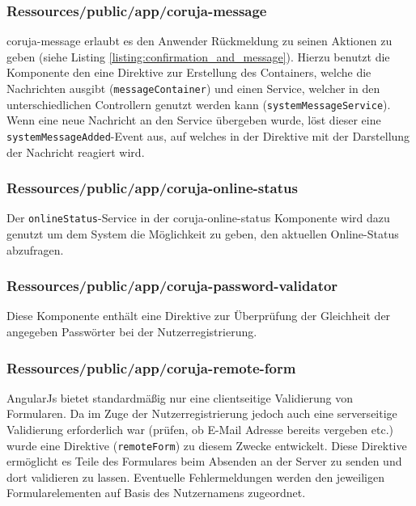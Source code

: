 \subsubsection*{Ressources/public/app/coruja-message}
coruja-message erlaubt es den Anwender Rückmeldung zu seinen Aktionen zu geben (siehe Listing \ref{listing:confirmation_and_message}). Hierzu benutzt die Komponente den eine Direktive zur Erstellung des Containers, welche die Nachrichten ausgibt (\texttt{messageContainer}) und einen Service, welcher in den unterschiedlichen Controllern genutzt werden kann (\texttt{systemMessageService}). Wenn eine neue Nachricht an den Service übergeben wurde, löst dieser eine \texttt{systemMessageAdded}-Event aus, auf welches in der Direktive mit der Darstellung der Nachricht reagiert wird. 

\subsubsection*{Ressources/public/app/coruja-online-status}
Der \texttt{onlineStatus}-Service in der coruja-online-status Komponente wird dazu genutzt um dem System die Möglichkeit zu geben, den aktuellen Online-Status abzufragen.

\subsubsection*{Ressources/public/app/coruja-password-validator}
Diese Komponente enthält eine Direktive zur Überprüfung der Gleichheit der angegeben Passwörter bei der Nutzerregistrierung.

\subsubsection*{Ressources/public/app/coruja-remote-form}
AngularJs bietet standardmäßig nur eine clientseitige Validierung von Formularen. Da im Zuge der Nutzerregistrierung jedoch auch eine serverseitige Validierung erforderlich war (prüfen, ob E-Mail Adresse bereits vergeben etc.) wurde eine Direktive (\texttt{remoteForm}) zu diesem Zwecke entwickelt. Diese Direktive ermöglicht es Teile des Formulares beim Absenden an der Server zu senden und dort validieren zu lassen. Eventuelle Fehlermeldungen werden den jeweiligen Formularelementen auf Basis des Nutzernamens zugeordnet.

